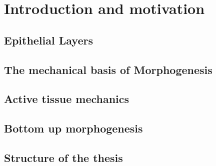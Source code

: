 \documentclass[11pt, final, a4paper, twoside, openright]{book}
\begin{document}
	\InitializeThesis
	
	 
	
	
	
	\frontmatter
	
	
	
	
	
	
	\mainmatter
	\part{Introduction and motivation}\label{part_1}


	\renewcommand{\thesection}{1.\arabic{section}}
	\hypertarget{epithelial-layers}{%
	\chapter{Epithelial Layers}\label{epithelial-layers}}
	

	\renewcommand{\thesection}{2.\arabic{section}}
	\hypertarget{the-mechanical-basis-of-morphogenesis}{%
	\chapter{The mechanical basis of
	Morphogenesis}\label{the-mechanical-basis-of-morphogenesis}}
	
	
	\renewcommand{\thesection}{3.\arabic{section}}
	\hypertarget{active-tissue-mechanics}{%
	\chapter{Active tissue mechanics}\label{active-tissue-mechanics}}
	

	\renewcommand{\thesection}{4.\arabic{section}}
	\hypertarget{bottom-up-morphogenesis}{%
	\chapter{Bottom up morphogenesis}\label{bottom-up-morphogenesis}}
	
	
	\renewcommand{\thesection}{5.\arabic{section}}
	\hypertarget{structure-of-the-thesis}{%
	\chapter{Structure of the thesis}\label{structure-of-the-thesis}}
	
	
\end{document}
